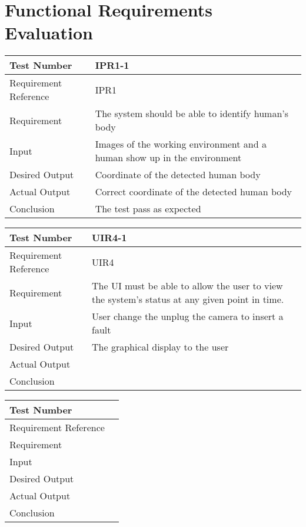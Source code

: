 \documentclass[12pt, titlepage]{article}
\begin{document}
\section{Functional Requirements Evaluation}
\begin{table}[h]
\begin{center}
\begin{tabular}{|p{} | p{}|}
\hline
  Test Number & IPR1-1\\
  \hline
  Requirement Reference & IPR1\\
  \hline
  Requirement &  The system should be able to identify human’s body\\
  \hline
  Input & Images of the working environment and a human show up in
the environment\\
  \hline
  Desired Output & Coordinate of the detected human body\\
  \hline
  Actual Output & Correct coordinate of the detected human body\\
  \hline
  Conclusion & The test pass as expected\\
  \hline
\end{tabular}
\end{center}           
\end{table}

\begin{table}[h]
\begin{center}
\begin{tabular}{|p{} | p{}|}
\hline
  Test Number & UIR4-1\\
  \hline
  Requirement Reference & UIR4\\
  \hline
  Requirement &  The UI must be able to allow the user to view the system’s status at any given point in time.\\
  \hline
  Input & User change the unplug the camera to insert a fault\\
  \hline
  Desired Output & The graphical display to the user\\
  \hline
  Actual Output & \\
  \hline
  Conclusion & \\
  \hline
\end{tabular}
\end{center}           
\end{table}

\begin{table}[h]
\begin{center}
\begin{tabular}{|l | l|}
\hline
  Test Number & \\
  \hline
  Requirement Reference & \\
  \hline
  Requirement &  \\
  \hline
  Input & \\
  \hline
  Desired Output & \\
  \hline
  Actual Output & \\
  \hline
  Conclusion & \\
  \hline
\end{tabular}
\end{center}           
\end{table}
\end{document}
